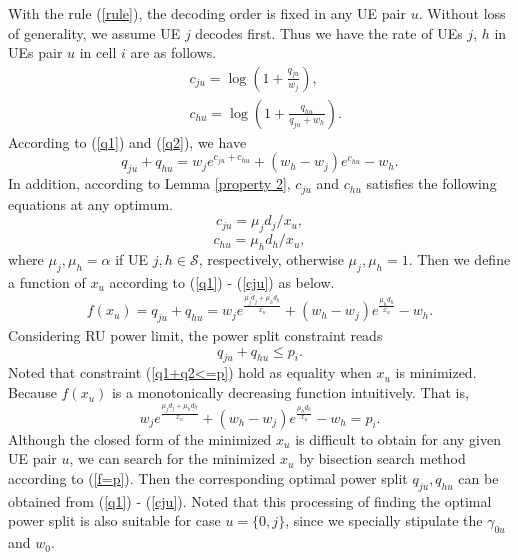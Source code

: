 \documentclass[10pt,journal,final,finalsubmission,twocolumn]{IEEEtran}
\begin{document}
With the rule (\ref{rule}), the decoding order is fixed in any UE pair $u$. Without loss of generality, we assume UE $j$ decodes first. Thus we have the rate of UEs $j$, $h$ in UEs pair $u$ in cell $i$ are as follows.
\begin{align}
&c_{ju} = \log(1+\frac{q_{ju}}{w_j}),\label{q1}\\
&c_{hu} = \log(1+\frac{q_{hu}}{q_{ju}+w_h}).\label{q2}
\end{align}
According to (\ref{q1}) and (\ref{q2}), we have 
\begin{equation}
q_{ju} + q_{hu} = w_j e^{c_{ju}+c_{hu}}+(w_h-w_j) e^{c_{hu}}-w_h.
\end{equation}
 In addition, according to Lemma \ref{property 2}, $c_{ju}$ and $c_{hu}$ satisfies the following equations at any optimum.
\begin{equation}\label{cju1}
c_{ju} = {\mu_j d_j}/{x_u},
\end{equation}
\begin{equation}\label{cju}
c_{hu} = {\mu_h d_h}/{x_u},
\end{equation}
where $\mu_j,\mu_h = \alpha$ if UE $j, h\in \mathcal{S}$, respectively, otherwise $\mu_j,\mu_h = 1$. Then we define a function of $x_u$ according to (\ref{q1}) - (\ref{cju}) as below.
 \begin{align}
 f(x_u) \!=\! q_{ju}\!+\!q_{hu}\! = \!w_je^{\frac{\mu_j d_j+\mu_h d_h}{x_u}}\!+\!(w_h\!-\!w_j)e^{\frac{\mu_h d_h}{x_u}}\!-\!w_h.\label{q1+q2}
 \end{align} 
Considering RU power limit, the power split constraint reads
\begin{equation}\label{q1+q2<=p}
q_{ju}+q_{hu} \leq p_i.
\end{equation}
Noted that constraint (\ref{q1+q2<=p}) hold as equality when $x_u$ is minimized. Because $f(x_u)$ is a monotonically decreasing function intuitively. That is,
 \begin{equation}\label{f=p}
w_je^{\frac{\mu_j d_j+\mu_h d_h}{x_u}}+(w_h-w_j)e^{\frac{\mu_h d_h}{x_u}}-w_h= p_i.
 \end{equation}
Although the closed form of the minimized $x_u$ is difficult to obtain for any given UE pair $u$, we can search for the minimized $x_u$ by bisection search method according to (\ref{f=p}). Then the corresponding optimal power split $q_{ju},q_{hu}$ can be obtained from (\ref{q1}) - (\ref{cju}). Noted that this processing of finding the optimal power split is also suitable for case $u=\{0,j\}$, since we specially stipulate the $\gamma_{0u}$ and $w_0$.
 
\end{document}
